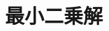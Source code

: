 \documentclass[../../topic_linear-algebra]{subfiles}
\begin{document}
\chapter{最小二乗解}
\end{document}
